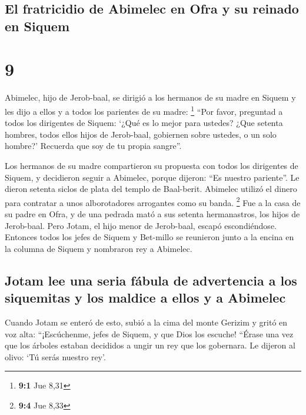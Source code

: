 \hypertarget{el-fratricidio-de-abimelec-en-ofra-y-su-reinado-en-siquem}{%
\subsection{El fratricidio de Abimelec en Ofra y su reinado en
Siquem}\label{el-fratricidio-de-abimelec-en-ofra-y-su-reinado-en-siquem}}

\hypertarget{section-8}{%
\section{9}\label{section-8}}

 Abimelec, hijo de Jerob-baal, se dirigió a los hermanos
de su madre en Siquem y les dijo a ellos y a todos los parientes de su
madre: \footnote{\textbf{9:1} Jue 8,31}  ``Por favor,
preguntad a todos los dirigentes de Siquem: `¿Qué es lo mejor para
ustedes? ¿Que setenta hombres, todos ellos hijos de Jerob-baal,
gobiernen sobre ustedes, o un solo hombre?' Recuerda que soy de tu
propia sangre''.

 Los hermanos de su madre compartieron su propuesta con
todos los dirigentes de Siquem, y decidieron seguir a Abimelec, porque
dijeron: ``Es nuestro pariente''.  Le dieron setenta
siclos de plata del templo de Baal-berit. Abimelec utilizó el dinero
para contratar a unos alborotadores arrogantes como su banda.
\footnote{\textbf{9:4} Jue 8,33}  Fue a la casa de su
padre en Ofra, y de una pedrada mató a sus setenta hermanastros, los
hijos de Jerob-baal. Pero Jotam, el hijo menor de Jerob-baal, escapó
escondiéndose.  Entonces todos los jefes de Siquem y
Bet-millo se reunieron junto a la encina en la columna de Siquem y
nombraron rey a Abimelec.

\hypertarget{jotam-lee-una-seria-fuxe1bula-de-advertencia-a-los-siquemitas-y-los-maldice-a-ellos-y-a-abimelec}{%
\subsection{Jotam lee una seria fábula de advertencia a los siquemitas y
los maldice a ellos y a
Abimelec}\label{jotam-lee-una-seria-fuxe1bula-de-advertencia-a-los-siquemitas-y-los-maldice-a-ellos-y-a-abimelec}}

 Cuando Jotam se enteró de esto, subió a la cima del monte
Gerizim y gritó en voz alta: ``¡Escúchenme, jefes de Siquem, y que Dios
los escuche!  ``Érase una vez que los árboles estaban
decididos a ungir un rey que los gobernara. Le dijeron al olivo: `Tú
serás nuestro rey'.

